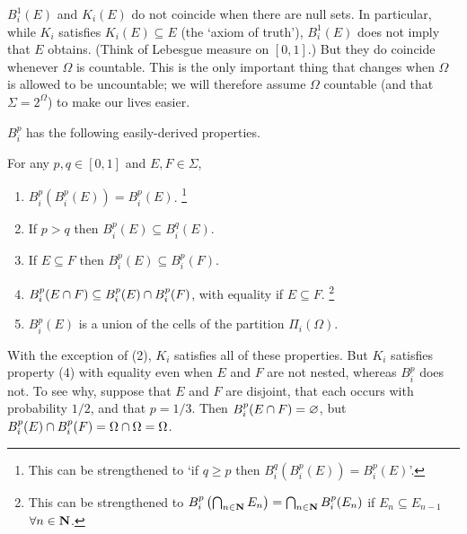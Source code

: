 \documentclass[11pt,letterpaper,reqno,oneside]{article}
\begin{document}
$B^1_i(E)$ and $K_i(E)$ do not coincide when there are null sets. In particular, while $K_i$ satisfies $K_i(E) \subseteq E$ (the `axiom of truth'), $B^1_i(E)$ does not imply that $E$ obtains. (Think of Lebesgue measure on $[0,1]$.) But they do coincide whenever $\Omega$ is countable. This is the only important thing that changes when $\Omega$ is allowed to be uncountable; we will therefore assume $\Omega$ countable (and that $\Sigma = 2^\Omega$) to make our lives easier.

$B^p_i$ has the following easily-derived properties.
%
\begin{proposition}
	\label{proposition:MS_Bp_properties}
	For any $p,q \in [0,1]$ and $E,F \in \Sigma$,
	\begin{enumerate}

		\item $B_i^p \left( B_i^p \left( E \right) \right) = B_i^p( E )$.%
			\footnote{This can be strengthened to `if $q \geq p$ then $B_i^q \left( B_i^p \left( E \right) \right) = B_i^p( E )$'.}

		\item If $p > q$ then $B_i^p(E) \subseteq B_i^q(E)$.

		\item If $E \subseteq F$ then $B^p_i(E) \subseteq B^p_i(F)$.

		\item $B^p_i( E \cap F ) \subseteq B^p_i(E) \cap B^p_i(F)$, with equality  if $E \subseteq F$.%
			\footnote{This can be strengthened to $B^p_i\left( \bigcap_{n \in \mathbf{N}} E_n \right) = \bigcap_{n \in \mathbf{N}} B^p_i(E_n)$ if $E_n \subseteq E_{n-1}$ $\forall n \in \mathbf{N}$.}

		\item $B^p_i(E)$ is a union of the cells of the partition $\Pi_i(\Omega)$.

	\end{enumerate}
\end{proposition}

With the exception of (2), $K_i$ satisfies all of these properties. But $K_i$ satisfies property (4) with equality even when $E$ and $F$ are not nested, whereas $B^p_i$ does not. To see why, suppose that $E$ and $F$ are disjoint, that each occurs with probability $1/2$, and that $p=1/3$. Then $B^p_i( E \cap F ) = \varnothing$, but $B_i^p(E) \cap B_i^p(F) = \Omega \cap \Omega = \Omega$.



\end{document}
